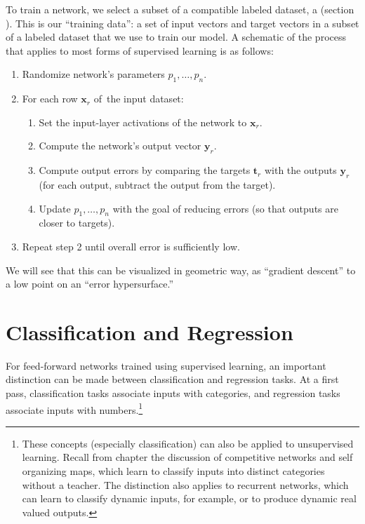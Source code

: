 To train a network, we select a subset of a compatible labeled dataset, a   (section ). This is our ``training data'': a set of input vectors and target vectors in a subset of a labeled dataset that we use to train our model. A schematic of the process that applies to most forms of supervised learning is as follows:
 \begin{enumerate}
\item Randomize network's parameters $p_1,\dots,p_n$.
\item For each row $\mathbf{x}_r$  of the input dataset:
\begin{enumerate}
\item Set the input-layer activations of the network to $\mathbf{x}_r$.
\item Compute the network's output vector $\mathbf{y}_r$. 
\item Compute output errors by comparing the targets $\mathbf{t}_r$ with the outputs $\mathbf{y}_r$ (for each output, subtract the output from the target).
\item Update $p_1,\dots, p_n$ with the goal of reducing errors (so that outputs are closer to targets).
\end{enumerate}
\item Repeat step 2 until overall error is sufficiently low.
\end{enumerate}
	

We will see that this can be visualized in geometric way, as ``gradient descent'' to a low point on an ``error hypersurface.''


\section{Classification and Regression}\label{classificationRegression}

For feed-forward networks trained using supervised learning, an important distinction can be made between classification and regression tasks. At a first pass, classification tasks associate inputs with categories, and regression tasks associate inputs with numbers.\footnote{These concepts (especially classification) can also be applied to unsupervised learning. Recall from chapter  the discussion of competitive networks and self organizing maps, which learn to classify inputs into distinct categories without a teacher. The distinction also applies to recurrent networks, which can learn to classify  dynamic inputs, for example, or to produce dynamic real valued outputs.} 

